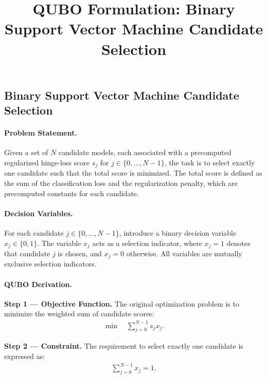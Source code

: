 \documentclass[12pt]{article}
\title{QUBO Formulation: Binary Support Vector Machine Candidate Selection}
\date{}
\begin{document}
\maketitle

\subsection*{Binary Support Vector Machine Candidate Selection}

\paragraph{Problem Statement.}
Given a set of $N$ candidate models, each associated with a precomputed regularized hinge-loss score $s_j$ for $j \in \{0, \dots, N-1\}$, the task is to select exactly one candidate such that the total score is minimized. The total score is defined as the sum of the classification loss and the regularization penalty, which are precomputed constants for each candidate.

\paragraph{Decision Variables.}
For each candidate $j \in \{0, \dots, N-1\}$, introduce a binary decision variable $x_j \in \{0, 1\}$. The variable $x_j$ acts as a selection indicator, where $x_j = 1$ denotes that candidate $j$ is chosen, and $x_j = 0$ otherwise. All variables are mutually exclusive selection indicators.

\paragraph{QUBO Derivation.}
\textbf{Step 1 --- Objective Function.} The original optimization problem is to minimize the weighted sum of candidate scores:
\begin{align}
  \min \quad \sum_{j=0}^{N-1} s_j x_j.
\end{align}

\textbf{Step 2 --- Constraint.} The requirement to select exactly one candidate is expressed as:
\begin{align}
  \sum_{j=0}^{N-1} x_j = 1.
\end{align}
\end{document}
